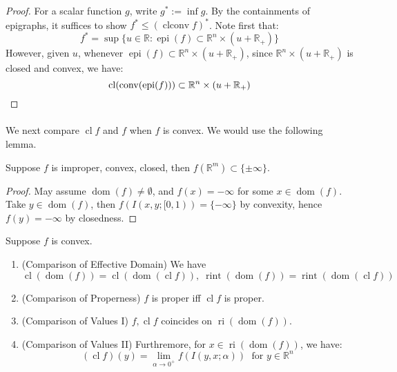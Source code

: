 \begin{proof}
	For a scalar function $g$, write $g^\ast:=\inf g$. By the containments of epigraphs, it suffices to show $f^\ast\leq(\operatorname{clconv}f)^\ast$. Note first that:
	\[
		f^\ast = \sup \{u\in \mathbb{R}: \operatorname{epi}(f)\subset \mathbb{R}^n\times (u + \mathbb{R}_+)\}
	\]
	However, given $u$, whenever $\operatorname{epi}(f)\subset \mathbb{R}^n\times (u + \mathbb{R}_+)$, since $\mathbb{R}^n\times (u + \mathbb{R}_+)$ is closed and convex, we have:
	\[
		\operatorname{cl}(\operatorname{conv}(\operatorname{epi}(f)))\subset \mathbb{R}^n\times (u + \mathbb{R}_+)\qedhere{}
	\]
\end{proof}

\paragraph{}We next compare $\operatorname{cl}f$ and $f$ when $f$ is convex. We would use the following lemma.

\begin{lemm}
	\label{lemm:023-improper-closed-convex}
	Suppose $f$ is improper, convex, closed, then $f(\mathbb{R}^m)\subset\{\pm\infty\}$.
\end{lemm}

\begin{proof}
	May assume $\operatorname{dom}(f)\neq \emptyset$, and $f(x)=-\infty$ for some $x\in \operatorname{dom}(f)$. Take $y\in \operatorname{dom}(f)$, then $f(I(x,y;[0, 1))=\{-\infty\}$ by convexity, hence $f(y)=-\infty$ by closedness.
\end{proof}


\begin{prop}
	\label{prop:023-compare-func-closure}
	Suppose $f$ is convex.
	\begin{enumerate}[label=(\alph*)]
		\item (Comparison of Effective Domain) We have
		      \[
			      \operatorname{cl}(\operatorname{dom}(f))=
			      \operatorname{cl}(\operatorname{dom}(\operatorname{cl}f)),\;
			      \operatorname{rint}(\operatorname{dom}(f))=
			      \operatorname{rint}(\operatorname{dom}(\operatorname{cl}f))
		      \]
		\item (Comparison of Properness) $f$ is proper iff $\operatorname{cl}f$ is proper.
		\item (Comparison of Values I) $f,\operatorname{cl}f$ coincides on $\operatorname{ri}(\operatorname{dom}(f))$.
		\item (Comparison of Values II) Furthremore, for $x\in \operatorname{ri}(\operatorname{dom}(f))$, we have:
		      \[
			      (\operatorname{cl}f)(y)=\lim_{\alpha \to0^+}f(I(y,x;\alpha ))\;\text{ for }y\in \mathbb{R}^n
		      \]
	\end{enumerate}
\end{prop}

